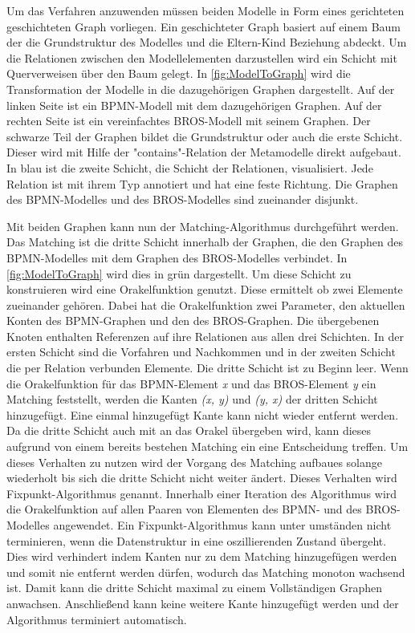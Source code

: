 Um das Verfahren anzuwenden müssen beiden Modelle in Form eines gerichteten geschichteten Graph vorliegen.
Ein geschichteter Graph basiert auf einem Baum der die Grundstruktur des Modelles und die Eltern-Kind Beziehung abdeckt.
Um die Relationen zwischen den Modellelementen darzustellen wird ein Schicht mit Querverweisen über den Baum gelegt.
In \cref{fig:ModelToGraph} wird die Transformation der Modelle in die dazugehörigen Graphen dargestellt.
Auf der linken Seite ist ein BPMN-Modell mit dem dazugehörigen Graphen. 
Auf der rechten Seite ist ein vereinfachtes BROS-Modell mit seinem Graphen.
Der schwarze Teil der Graphen bildet die Grundstruktur oder auch die erste Schicht.
Dieser wird mit Hilfe der "contains"-Relation der Metamodelle direkt aufgebaut.
In blau ist die zweite Schicht, die Schicht der Relationen, visualisiert.
Jede Relation ist mit ihrem Typ annotiert und hat eine feste Richtung.
Die Graphen des BPMN-Modelles und des BROS-Modelles sind zueinander disjunkt.

Mit beiden Graphen kann nun der Matching-Algorithmus durchgeführt werden.
Das Matching ist die dritte Schicht innerhalb der Graphen, die den Graphen des BPMN-Modelles mit dem Graphen des BROS-Modelles verbindet.
In \cref{fig:ModelToGraph} wird dies in grün dargestellt.
Um diese Schicht zu konstruieren wird eine Orakelfunktion genutzt.
Diese ermittelt ob zwei Elemente zueinander gehören.
Dabei hat die Orakelfunktion zwei Parameter, den aktuellen Konten des BPMN-Graphen und den des BROS-Graphen.
Die übergebenen Knoten enthalten Referenzen auf ihre Relationen aus allen drei Schichten.
In der ersten Schicht sind die Vorfahren und Nachkommen und in der zweiten Schicht die per Relation verbunden Elemente.
Die dritte Schicht ist zu Beginn leer.
Wenn die Orakelfunktion für das BPMN-Element \emph{x} und das BROS-Element \emph{y} ein Matching feststellt, werden die Kanten \emph{(x, y)} und \emph{(y, x)} der dritten Schicht hinzugefügt.
Eine einmal hinzugefügt Kante kann nicht wieder entfernt werden.
Da die dritte Schicht auch mit an das Orakel übergeben wird, kann dieses aufgrund von einem bereits bestehen Matching ein eine Entscheidung treffen.
Um dieses Verhalten zu nutzen wird der Vorgang des Matching aufbaues solange wiederholt bis sich die dritte Schicht nicht weiter ändert.
Dieses Verhalten wird Fixpunkt-Algorithmus genannt.
Innerhalb einer Iteration des Algorithmus wird die Orakelfunktion auf allen Paaren von Elementen des BPMN- und des BROS-Modelles angewendet.
Ein Fixpunkt-Algorithmus kann unter umständen nicht terminieren, wenn die Datenstruktur in eine oszillierenden Zustand übergeht.
Dies wird verhindert indem Kanten nur zu dem Matching hinzugefügen werden und somit nie entfernt werden dürfen, wodurch das Matching monoton wachsend ist.
Damit kann die dritte Schicht maximal zu einem Vollständigen Graphen anwachsen.
Anschließend kann keine weitere Kante hinzugefügt werden und der Algorithmus terminiert automatisch.

